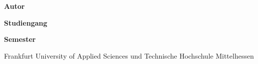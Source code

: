 
\begin{flushleft}

\textbf{Autor}

\Autor

\textbf{Studiengang}

\Studiengang

\textbf{Semester}

\Semester

\end{flushleft}

\vfill


\begin{center}

Frankfurt University of Applied Sciences und 
Technische Hochschule Mittelhessen
\end{center}

\clearpage